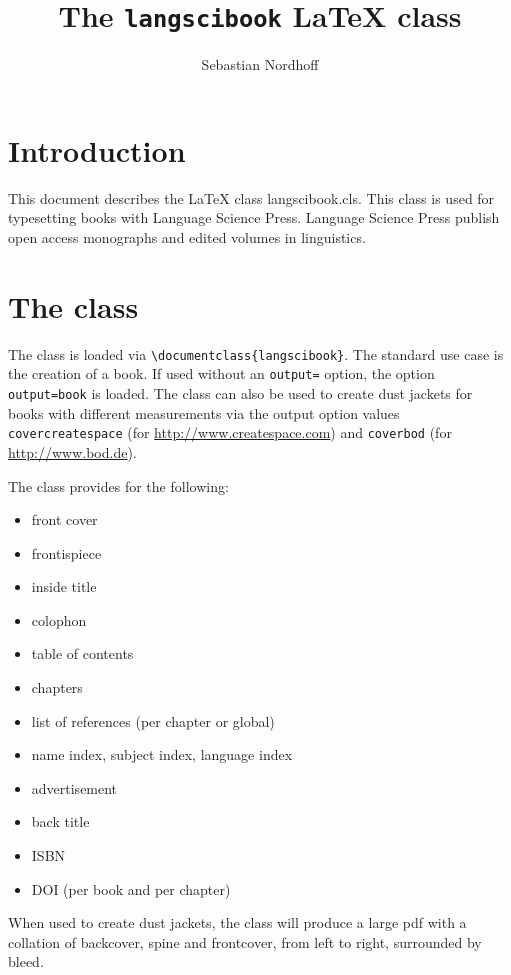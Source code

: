 \documentclass[%
modfonts,
output=guidelines,
guidelines]{langscibook}
\author{Sebastian Nordhoff}
\title{The \texttt{langscibook} {\LaTeX} class}
\subtitle{}
\begin{document}
\maketitle

\frontmatter
{} %
\tableofcontents
% 
% 
%  

\mainmatter       
\chapter{Introduction}
This document describes the {\LaTeX} class langscibook.cls. This class is used for typesetting books with Language Science Press. Language Science Press publish open access monographs and edited volumes in linguistics. 


\chapter{The class}
The class is loaded via \verb+\documentclass{langscibook}+. The standard use case is the creation of a book. If used without an \texttt{output=} option, the option \texttt{output=book} is loaded. The class can also be used to create dust jackets for books with different measurements via the output option values 
\texttt{covercreatespace} (for \url{http://www.createspace.com}) and
\texttt{coverbod} (for \url{http://www.bod.de}).

The class provides for the following:
\begin{itemize}
 \item front cover
 \item frontispiece 
 \item inside title 
 \item colophon 
 \item table of contents
 \item chapters 
 \item list of references (per chapter or global)
 \item name index, subject index, language index
 \item advertisement 
 \item back title 
 \item ISBN
 \item DOI (per book and per chapter)
\end{itemize}

When used to create dust jackets, the class will produce a large pdf with a collation of backcover, spine and frontcover, from left to right, surrounded by bleed.
\end{document}
